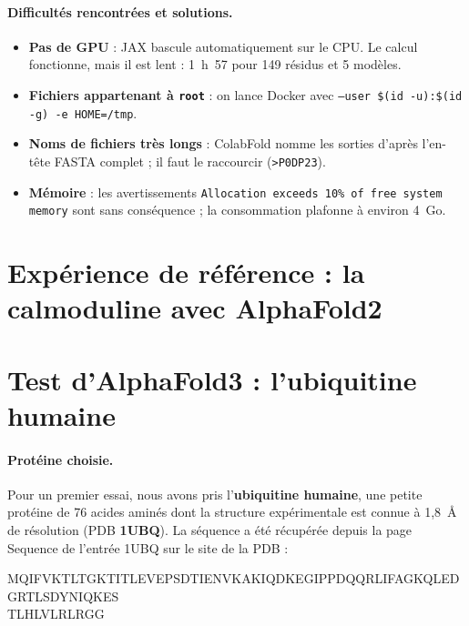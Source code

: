 \paragraph{Difficultés rencontrées et solutions.}
\begin{itemize}
  \item \textbf{Pas de GPU} : JAX bascule automatiquement sur le CPU. Le calcul fonctionne, mais il est lent : 1~h~57 pour 149 résidus et 5 modèles.
  \item \textbf{Fichiers appartenant à \texttt{root}} : on lance Docker avec \texttt{--user \$(id -u):\$(id -g) -e HOME=/tmp}.
  \item \textbf{Noms de fichiers très longs} : ColabFold nomme les sorties d'après l'en-tête FASTA complet ; il faut le raccourcir (\texttt{>P0DP23}).
  \item \textbf{Mémoire} : les avertissements \texttt{Allocation exceeds 10\% of free system memory} sont sans conséquence ; la consommation plafonne à environ 4~Go.
\end{itemize}

\section{Expérience de référence : la calmoduline avec AlphaFold2}
\label{sec:test}



\section{Test d'AlphaFold3 : l'ubiquitine humaine}
\label{sec:af3}

\paragraph{Protéine choisie.} Pour un premier essai, nous avons pris l'\textbf{ubiquitine humaine}, une petite protéine de 76 acides aminés dont la structure expérimentale est connue à 1,8~Å de résolution (PDB \textbf{1UBQ}). La séquence a été récupérée depuis la page \og Sequence \fg{} de l'entrée 1UBQ sur le site de la PDB :

\begin{center}
\scriptsize\ttfamily
MQIFVKTLTGKTITLEVEPSDTIENVKAKIQDKEGIPPDQQRLIFAGKQLEDGRTLSDYNIQKES\\
TLHLVLRLRGG
\end{center}

